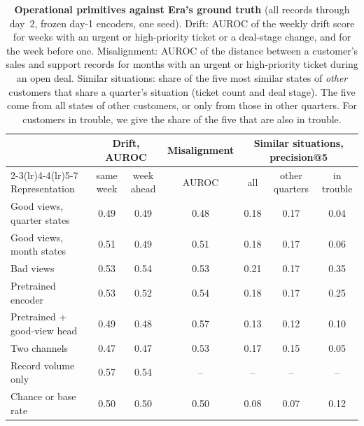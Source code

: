 \documentclass[11pt]{article}
\begin{document}
\begin{table}[h]
\centering
\small
\caption{\textbf{Operational primitives against Era's ground truth} (all records through day~2, frozen day-1 encoders, one seed). Drift: AUROC of the weekly drift score for weeks with an urgent or high-priority ticket or a deal-stage change, and for the week before one. Misalignment: AUROC of the distance between a customer's sales and support records for months with an urgent or high-priority ticket during an open deal. Similar situations: share of the five most similar states of \emph{other} customers that share a quarter's situation (ticket count and deal stage). The five come from all states of other customers, or only from those in other quarters. For customers in trouble, we give the share of the five that are also in trouble.}
\label{tab:primitives}
\setlength{\tabcolsep}{3.5pt}\begin{tabular}{lcccccc}
\toprule
& \multicolumn{2}{c}{Drift, AUROC} & Misalignment & \multicolumn{3}{c}{Similar situations, precision@5} \\
\cmidrule(lr){2-3}\cmidrule(lr){4-4}\cmidrule(lr){5-7}
Representation & same week & week ahead & AUROC & all & other quarters & in trouble \\
\midrule
Good views, quarter states & 0.49 & 0.49 & 0.48 & 0.18 & 0.17 & 0.04 \\
Good views, month states & 0.51 & 0.49 & 0.51 & 0.18 & 0.17 & 0.06 \\
Bad views & 0.53 & 0.54 & 0.53 & 0.21 & 0.17 & 0.35 \\
Pretrained encoder & 0.53 & 0.52 & 0.54 & 0.18 & 0.17 & 0.25 \\
Pretrained + good-view head & 0.49 & 0.48 & 0.57 & 0.13 & 0.12 & 0.10 \\
Two channels & 0.47 & 0.47 & 0.53 & 0.17 & 0.15 & 0.05 \\
Record volume only & 0.57 & 0.54 & -- & -- & -- & -- \\
\midrule
Chance or base rate & 0.50 & 0.50 & 0.50 & 0.08 & 0.07 & 0.12 \\
\bottomrule
\end{tabular}
\end{table}
\end{document}
